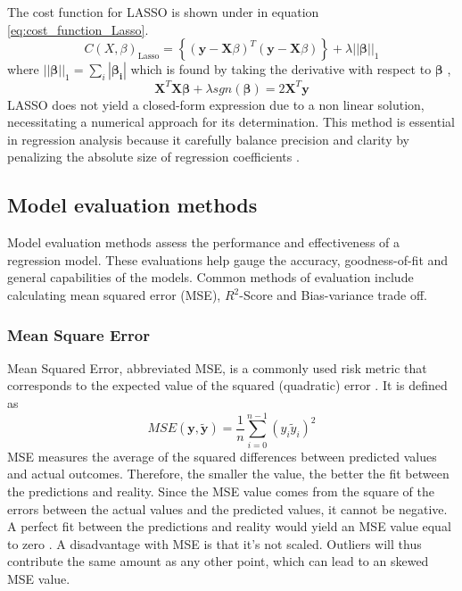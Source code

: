 \noindent The cost function for LASSO is shown under in equation \eqref{eq:cost_function_Lasso}. 
%
\begin{equation}\label{eq:cost_function_Lasso}
    C(X,\beta)_\text{Lasso} =  \left\lbrace ( \textbf{y} - \textbf{X}\beta )^T (\textbf{y} - \textbf{X}\beta)\right\rbrace + \lambda||\boldsymbol{\beta}||_1  
\end{equation}
%
\noindent where $||\boldsymbol{\beta}||_1 = \sum_{i} |\boldsymbol{\beta_i}|$ which is found by taking the derivative with respect to $\boldsymbol{\beta}$ \cite{SpringerCh3}, 
%
\begin{equation}\label{eq:optimal_lasso}
    \mathbf{X}^T\mathbf{X}\boldsymbol{\beta} + \lambda sgn(\boldsymbol{\beta}) = 2\mathbf{X}^T\boldsymbol{y} 
\end{equation}
%
\noindent LASSO does not yield a closed-form expression due to a non linear solution, necessitating a numerical approach for its determination. 
This method is essential in regression analysis because it carefully balance precision and clarity by penalizing the absolute size of regression coefficients \cite{Wessel}.

\subsection{Model evaluation methods}
\noindent Model evaluation methods assess the performance and effectiveness of a regression model. These evaluations help gauge the accuracy, goodness-of-fit and general capabilities of the models. Common methods of evaluation include calculating mean squared error (MSE), $R^2$-Score and Bias-variance trade off.
%
\subsubsection{Mean Square Error}
\noindent Mean Squared Error, abbreviated MSE, is a commonly used risk metric that corresponds to the expected value of the squared (quadratic) error \cite{Week34}. It is defined as 
%
\begin{equation}\label{eq:MSE} 
 MSE(\boldsymbol{y},\tilde{\boldsymbol{y}}) = \frac{1}{n} \sum_{i=0}^{n-1}(y_i \tilde{y}_i)^2
\end{equation}
%
\noindent MSE measures the average of the squared differences between predicted values and actual outcomes. Therefore, the smaller the value, the better the fit between the predictions and reality. Since the MSE value comes from the square of the errors between the actual values and the predicted values, it cannot be negative. A perfect fit between the predictions and reality would yield an MSE value equal to zero \cite{Week34}. A disadvantage with MSE is that it's not scaled. Outliers will thus contribute the same amount as any other point, which can lead to an skewed MSE value. 

